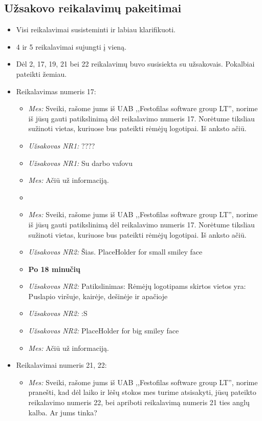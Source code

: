 \documentclass{VUMIFPSkursinis}
\begin{document}
	\subsection{Užsakovo reikalavimų pakeitimai} \label{priedai_uzsakovoReikalavimaiPakeitimai}
		\begin{itemize}
			\item Visi reikalavimai susisteminti ir labiau klarifikuoti.
			\item 4 ir 5 reikalavimai sujungti į vieną.
			\item Dėl 2, 17, 19, 21 bei 22 reikalavimų buvo susisiekta su užsakovais. Pokalbiai pateikti žemiau.
			\item Reikalavimas numeris 17:
				\begin{itemize}
					\item \textit{Mes:} Sveiki, rašome jums iš UAB ,,Festofilas software group LT'', norime iš jūsų gauti patikslinimą dėl reikalavimo numeris 17. Norėtume tiksliau sužinoti vietas, kuriuose bus pateikti rėmėjų logotipai. Iš anksto ačiū.
					\item \textit{Užsakovas NR1:} ????
					\item \textit{Užsakovas NR1:} Su darbo vafovu
					\item \textit{Mes:} Ačiū už informaciją.
					\item[ ]
					\item \textit{Mes:} Sveiki, rašome jums iš UAB ,,Festofilas software group LT'', norime iš jūsų gauti patikslinimą dėl reikalavimo numeris 17. Norėtume tiksliau sužinoti vietas, kuriuose bus pateikti rėmėjų logotipai. Iš anksto ačiū.
					\item \textit{Užsakovas NR2:} Šias. {PlaceHolder for small smiley face}
					\item[ ]\textbf{Po 18 minučių}
					\item \textit{Užsakovas NR2:} Patikslinimas: Rėmėjų logotipams skirtos vietos yra: Puslapio viršuje, kairėje, dešinėje ir apačioje
					\item \textit{Užsakovas NR2:} :S
					\item \textit{Užsakovas NR2:} {PlaceHolder for big smiley face}
					\item \textit{Mes:} Ačiū už informaciją.
				\end{itemize}
			\item Reikalavimai numeris 21, 22:
				\begin{itemize}
					\item \textit{Mes:} Sveiki, rašome jums iš UAB ,,Festofilas software group LT'', norime pranešti, kad dėl laiko ir lėšų stokos mes turime atsisakyti, jūsų pateikto reikalavimo numeris 22, bei apriboti reikalavimą numeris 21 ties anglų kalba. Ar jums tinka?

\end{itemize}
\end{itemize}
\end{document}
